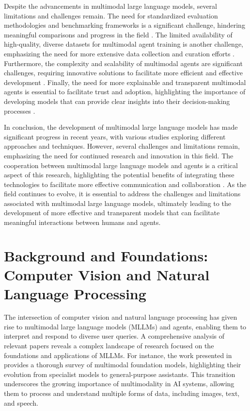 \documentclass[conference]{IEEEtran}
\begin{document}
Despite the advancements in multimodal large language models, several limitations and challenges remain. The need for standardized evaluation methodologies and benchmarking frameworks is a significant challenge, hindering meaningful comparisons and progress in the field \cite{b15}. The limited availability of high-quality, diverse datasets for multimodal agent training is another challenge, emphasizing the need for more extensive data collection and curation efforts \cite{b16}. Furthermore, the complexity and scalability of multimodal agents are significant challenges, requiring innovative solutions to facilitate more efficient and effective development \cite{b17}. Finally, the need for more explainable and transparent multimodal agents is essential to facilitate trust and adoption, highlighting the importance of developing models that can provide clear insights into their decision-making processes \cite{b18}.

In conclusion, the development of multimodal large language models has made significant progress in recent years, with various studies exploring different approaches and techniques. However, several challenges and limitations remain, emphasizing the need for continued research and innovation in this field. The cooperation between multimodal large language models and agents is a critical aspect of this research, highlighting the potential benefits of integrating these technologies to facilitate more effective communication and collaboration \cite{b19}. As the field continues to evolve, it is essential to address the challenges and limitations associated with multimodal large language models, ultimately leading to the development of more effective and transparent models that can facilitate meaningful interactions between humans and agents.

\section{Background and Foundations: Computer Vision and Natural Language Processing}
The intersection of computer vision and natural language processing has given rise to multimodal large language models (MLLMs) and agents, enabling them to interpret and respond to diverse user queries. A comprehensive analysis of relevant papers reveals a complex landscape of research focused on the foundations and applications of MLLMs. For instance, the work presented in \cite{b1} provides a thorough survey of multimodal foundation models, highlighting their evolution from specialist models to general-purpose assistants. This transition underscores the growing importance of multimodality in AI systems, allowing them to process and understand multiple forms of data, including images, text, and speech.
\end{document}
